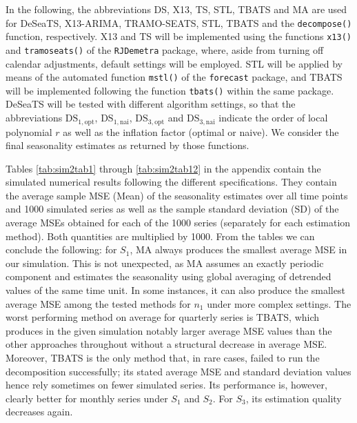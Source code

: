 In the following, the abbreviations DS, X13, TS, STL, TBATS and MA are used for DeSeaTS, X13-ARIMA, TRAMO-SEATS, STL, TBATS and the \texttt{decompose()} function, respectively. X13 and TS will be implemented using the functions \texttt{x13()} and \texttt{tramoseats()} of the \texttt{RJDemetra} package, where, aside from turning off calendar adjustments, default settings will be employed. STL will be applied by means of the automated function \texttt{mstl()} of the \texttt{forecast} package, and TBATS will be implemented following the function \texttt{tbats()} within the same package. DeSeaTS will be tested with different algorithm settings, so that the abbreviations \(\text{DS}_{1,\text{opt}}\), \(\text{DS}_{1,\text{nai}}\), \(\text{DS}_{3,\text{opt}}\) and \(\text{DS}_{3,\text{nai}}\) indicate the order of local polynomial \(r\) as well as the inflation factor (optimal or naive). We consider the final seasonality estimates as returned by those functions.

Tables \ref{tab:sim2tab1} through \ref{tab:sim2tab12} in the appendix contain the simulated numerical results following the different specifications. They contain the average sample MSE (Mean) of the seasonality estimates over all time points and 1000 simulated series as well as the sample standard deviation (SD) of the average MSEs obtained for each of the 1000 series (separately for each estimation method). Both quantities are multiplied by 1000. From the tables we can conclude the following: for \(S_1\), MA always produces the smallest average MSE in our simulation. This is not unexpected, as MA assumes an exactly periodic component and estimates the seasonality using global averaging of detrended values of the same time unit. In some instances, it can also produce the smallest average MSE among the tested methods for \(n_1\) under more complex settings. The worst performing method on average for quarterly series is TBATS, which produces in the given simulation notably larger average MSE values than the other approaches throughout without a structural decrease in average MSE. Moreover, TBATS is the only method that, in rare cases, failed to run the decomposition successfully; its stated average MSE and standard deviation values hence rely sometimes on fewer simulated series. Its performance is, however, clearly better for monthly series under \(S_1\) and \(S_2\). For \(S_3\), its estimation quality decreases again.


